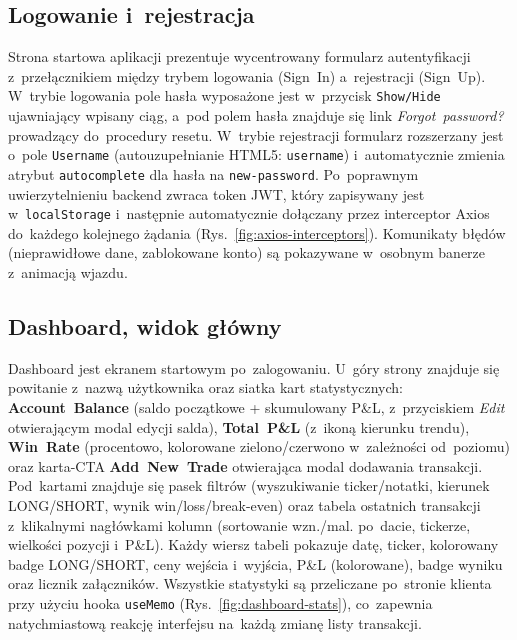 \documentclass[12pt,a4paper]{article}
\begin{document}
\subsection*{Logowanie i~rejestracja}
Strona startowa aplikacji prezentuje wycentrowany formularz autentyfikacji z~przełącznikiem między trybem logowania (Sign~In) a~rejestracji (Sign~Up). W~trybie logowania pole hasła wyposażone jest w~przycisk \texttt{Show/Hide} ujawniający wpisany ciąg, a~pod polem hasła znajduje się link \emph{Forgot~password?} prowadzący do~procedury resetu. W~trybie rejestracji formularz rozszerzany jest o~pole \texttt{Username} (autouzupełnianie HTML5: \texttt{username}) i~automatycznie zmienia atrybut \texttt{autocomplete} dla hasła na \texttt{new-password}. Po~poprawnym uwierzytelnieniu backend zwraca token JWT, który zapisywany jest w~\texttt{localStorage} i~następnie automatycznie dołączany przez interceptor Axios do~każdego kolejnego żądania (Rys.~\ref{fig:axios-interceptors}). Komunikaty błędów (nieprawidłowe dane, zablokowane konto) są pokazywane w~osobnym banerze z~animacją wjazdu.

\subsection*{Dashboard, widok główny}
Dashboard jest ekranem startowym po~zalogowaniu. U~góry strony znajduje się powitanie z~nazwą użytkownika oraz siatka kart statystycznych: \textbf{Account~Balance} (saldo początkowe + skumulowany P\&L, z~przyciskiem \emph{Edit} otwierającym modal edycji salda), \textbf{Total~P\&L} (z~ikoną kierunku trendu), \textbf{Win~Rate} (procentowo, kolorowane zielono/czerwono w~zależności od~poziomu) oraz karta-CTA \textbf{Add~New~Trade} otwierająca modal dodawania transakcji. Pod~kartami znajduje się pasek filtrów (wyszukiwanie ticker/notatki, kierunek LONG/SHORT, wynik win/loss/break-even) oraz tabela ostatnich transakcji z~klikalnymi nagłówkami kolumn (sortowanie wzn./mal. po~dacie, tickerze, wielkości pozycji i~P\&L). Każdy wiersz tabeli pokazuje datę, ticker, kolorowany badge LONG/SHORT, ceny wejścia i~wyjścia, P\&L (kolorowane), badge wyniku oraz licznik załączników. Wszystkie statystyki są przeliczane po~stronie klienta przy użyciu hooka \texttt{useMemo} (Rys.~\ref{fig:dashboard-stats}), co~zapewnia natychmiastową reakcję interfejsu na~każdą zmianę listy transakcji.
\end{document}
